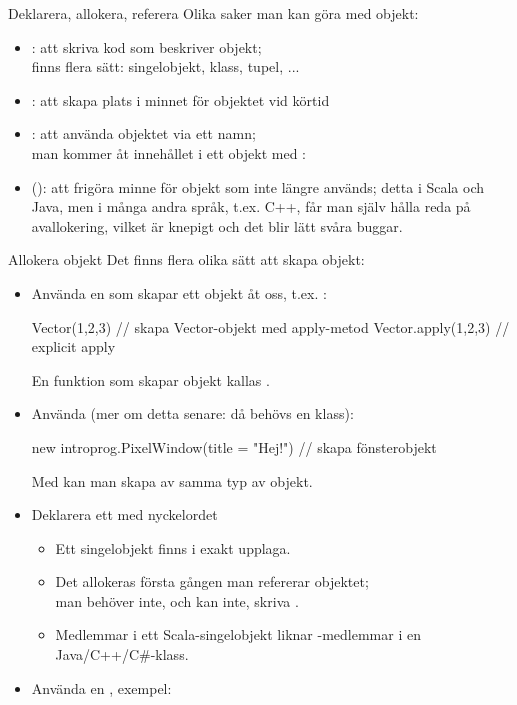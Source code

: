 \begin{Slide}{Deklarera, allokera, referera}
Olika saker man kan göra med objekt:
\begin{itemize}
  \item {}: att skriva kod som beskriver objekt; \\
  finns flera sätt: singelobjekt, klass, tupel, ...
  \item {}: att skapa plats i minnet för objektet vid körtid
  \item {}: att använda objektet via ett namn;\\
  man kommer åt innehållet i ett objekt med : \\
  \pause
  \item (): att frigöra minne för objekt som inte längre används;
  detta  i Scala och Java, men i många andra språk,
  t.ex. C++, får man själv hålla reda på avallokering,
  vilket är knepigt och det blir lätt svåra buggar.
\end{itemize}
\end{Slide}


\begin{Slide}{Allokera objekt}\SlideFontSmall
Det finns flera olika sätt att skapa objekt:
\begin{itemize}

\item Använda en  som skapar ett objekt åt oss, t.ex. :
\begin{Code}
Vector(1,2,3)  // skapa Vector-objekt med apply-metod
Vector.apply(1,2,3)  // explicit apply
\end{Code}
{\SlideFontSmall En funktion som skapar objekt kallas .\vspace{0.5em}}

\item Använda  (mer om detta senare: då behövs en klass):
\begin{Code}
new introprog.PixelWindow(title = "Hej!") // skapa fönsterobjekt
\end{Code}
{\SlideFontSmall Med  kan man skapa  av samma typ av objekt.\vspace{0.5em}}

\item Deklarera ett  med nyckelordet 
\begin{itemize}\SlideFontSmall
  \item Ett singelobjekt finns i exakt  upplaga.
  \item Det allokeras  första gången man refererar objektet; \\
  man behöver inte, och kan inte, skriva .
  \pause
  \item Medlemmar i ett Scala-singelobjekt liknar -medlemmar i en Java/C++/C\#-klass.
\end{itemize}
\item Använda en , exempel: 
\end{itemize}
\end{Slide}


